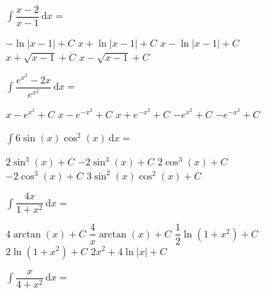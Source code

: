 \begin{questions}
    \question $\int \dfrac{x - 2}{x - 1} \,\mathrm{d}x = $ \\

    \begin{oneparchoices}
        \choice $-\ln |x - 1| + C$
        \choice $x + \ln |x - 1| + C$
        \choice $x - \ln |x - 1| + C$ \\[11pt]
        \makebox[0.21\textwidth] \choice $x + \sqrt{x - 1} + C$
        \makebox[0.22\textwidth] \choice $x - \sqrt{x - 1} + C$
    \end{oneparchoices} \par \horizontalline

    \question $\int \dfrac{e^{x^2} - 2x}{e^{x^2}} \,\mathrm{d}x = $ \\

    \begin{oneparchoices}
        \choice $x - e^{x^2} + C$ 
        \choice $x - e^{-x^2} + C$
        \choice $x + e^{-x^2} + C$
        \choice $-e^{x^2} + C$
        \choice $-e^{-x^2} + C$
    \end{oneparchoices} \par \horizontalline

    \question $\int 6\sin (x)\cos^2 (x) \,\mathrm{d}x = $ \\

    \begin{oneparchoices}
        \choice $2\sin^3 (x) + C$
        \choice $-2\sin^3 (x) + C$
        \choice $2\cos^3 (x) + C$ \\[11pt]
        \makebox[0.20\textwidth] \choice $-2\cos^3 (x) + C$
        \makebox[0.22\textwidth] \choice $3\sin^2 (x)\cos^2 (x) + C$
    \end{oneparchoices} \par \horizontalline

    \question $\int \dfrac{4x}{1 + x^2} \,\mathrm{d}x = $ \\

    \begin{oneparchoices}
        \choice $4\arctan (x) + C$
        \choice $\dfrac{4}{x}\arctan(x) + C$
        \choice $\dfrac{1}{2}\ln \left(1 + x^2\right) + C$ \\[11pt]
        \makebox[0.20\textwidth] \choice $2\ln \left(1 + x^2\right) + C$
        \makebox[0.21\textwidth] \choice $2x^2 + 4\ln |x| + C$
    \end{oneparchoices} \par \horizontalline

    \question $\int \dfrac{x}{4 + x^2} \,\mathrm{d}x = $ \\
    

\end{questions}

